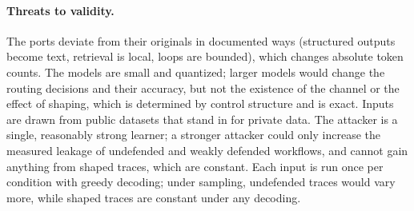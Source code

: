 \paragraph{Threats to validity.} The ports deviate from their originals in documented ways (structured outputs become text, retrieval is local, loops are bounded), which changes absolute token counts. The models are small and quantized; larger models would change the routing decisions and their accuracy, but not the existence of the channel or the effect of shaping, which is determined by control structure and is exact. Inputs are drawn from public datasets that stand in for private data. The attacker is a single, reasonably strong learner; a stronger attacker could only increase the measured leakage of undefended and weakly defended workflows, and cannot gain anything from shaped traces, which are constant. Each input is run once per condition with greedy decoding; under sampling, undefended traces would vary more, while shaped traces are constant under any decoding.
